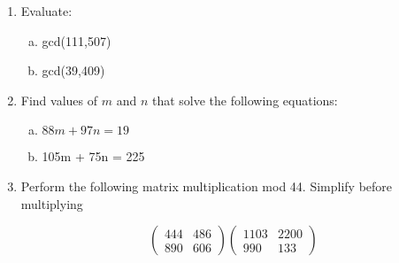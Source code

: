 \begin{enumerate}[(1)]
\item
Evaluate: 
\begin{enumerate}[(a)]
\item
 gcd(111,507) 
\item
gcd(39,409)
\end{enumerate}

\item
Find values of $m$ and $n$ that solve the following equations:
\begin{enumerate}[(a)]
\item
$88m + 97n = 19$
\item
105m + 75n = 225
\end{enumerate}

\item
Perform the following matrix multiplication mod 44. Simplify before multiplying

$$\left(
\begin{array}{cc}
444 & 486 \\
890 & 606
\end{array}
\right)
\left(
\begin{array}{cc}
1103 & 2200 \\
990 & 133
\end{array}
\right)$$


\end{enumerate}
